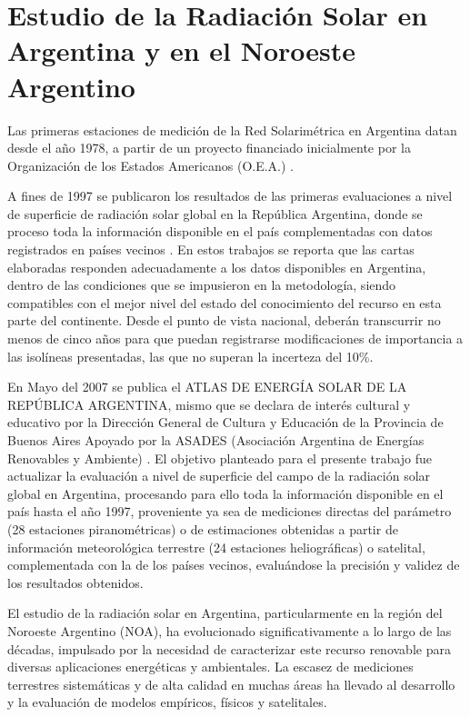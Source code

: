 \section{Estudio de la Radiación Solar en Argentina y en el Noroeste Argentino}

Las primeras estaciones de medición de la Red Solarimétrica en Argentina datan desde el año 1978, a partir de un proyecto financiado inicialmente por la Organización de los Estados Americanos (O.E.A.) \cite{GrossiGallegos1999}.

A fines de 1997 se publicaron los resultados de las primeras evaluaciones a nivel de superficie de radiación solar global en la República Argentina, donde se proceso toda la información disponible en el país complementadas con datos registrados en países vecinos \cite{GrossiGallegos1998A, GrossiGallegos1998B}. En estos trabajos se reporta que  las cartas elaboradas responden adecuadamente a los datos  disponibles en Argentina, dentro de las condiciones que se impusieron en la metodología, siendo compatibles con el mejor nivel del estado del conocimiento del recurso en esta parte del continente.
Desde el punto de vista nacional, deberán transcurrir no menos de cinco años para que puedan registrarse modificaciones de
importancia a las isolíneas presentadas, las que no superan la incerteza del 10\%.


En Mayo del 2007 se publica el ATLAS DE ENERGÍA SOLAR DE LA REPÚBLICA ARGENTINA, mismo que se declara de interés cultural y educativo por la Dirección General
de Cultura y Educación de la Provincia de Buenos Aires Apoyado por la ASADES (Asociación Argentina de Energías Renovables y Ambiente) \cite{GrossiRighini2007}. El objetivo planteado para el presente trabajo fue actualizar la evaluación a nivel de superficie del campo de la radiación solar global en Argentina, procesando para ello toda la información disponible en el país hasta el año 1997, proveniente ya sea de mediciones directas del parámetro (28 estaciones piranométricas) o de estimaciones obtenidas a partir de información meteorológica terrestre (24 estaciones heliográficas) o satelital, complementada con la de los países vecinos, evaluándose la precisión y validez de los resultados obtenidos.



El estudio de la radiación solar en Argentina, particularmente en la región del Noroeste Argentino (NOA), ha evolucionado significativamente a lo largo de las décadas, impulsado por la necesidad de caracterizar este recurso renovable para diversas aplicaciones energéticas y ambientales. La escasez de mediciones terrestres sistemáticas y de alta calidad en muchas áreas ha llevado al desarrollo y la evaluación de modelos empíricos, físicos y satelitales.\\

